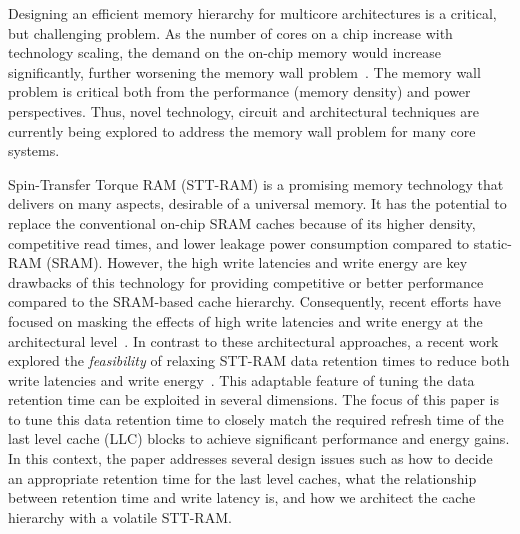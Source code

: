
Designing an efficient memory hierarchy for multicore architectures is a critical, but challenging
problem. As the number of cores on a chip increase with technology scaling, the demand on the on-chip
memory would increase significantly, further worsening the memory wall problem~\cite{BurgerGK96}. The
memory wall problem is critical both from the performance (memory density) and power perspectives.
Thus, novel technology, circuit and architectural techniques are currently being explored to address
the memory wall problem for many core systems.





Spin-Transfer Torque RAM (STT-RAM) is a promising memory technology that delivers on many aspects,
desirable of a universal memory. It has the potential to replace the conventional on-chip SRAM
caches because of its higher density, competitive read times, and lower leakage power consumption
compared to static-RAM (SRAM). However, the high write latencies and write energy are key drawbacks
of this technology for providing competitive or better performance compared to the SRAM-based cache
hierarchy. Consequently, recent efforts have focused on masking the effects of high write latencies
and write energy at the architectural level~\cite{mram-energy-reduction,gsun-hpca}. In contrast to
these architectural approaches, a recent  work explored the {\it feasibility} of relaxing STT-RAM
data retention times to reduce both write latencies and write energy~\cite{STTRAM:HPCA11}. This
adaptable feature of tuning the data retention time can be exploited in several dimensions. The focus
of this paper is to tune this data retention time to closely match the required refresh time of the last
level cache (LLC) blocks to achieve significant performance and energy gains. In this context, the paper
addresses several design issues such as how to decide an appropriate retention time for the last
level caches, what the relationship between retention time and write latency is, and how we
architect the cache hierarchy with a volatile STT-RAM.

